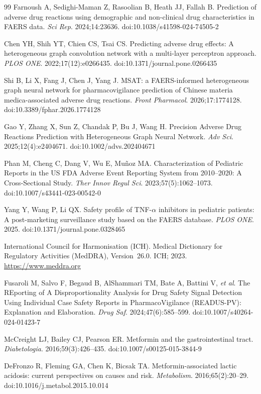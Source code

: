 \documentclass[10pt]{article}
\begin{document}
\begin{thebibliography}{99}
Farnoush A, Sedighi-Maman Z, Rasoolian B, Heath JJ, Fallah B.
Prediction of adverse drug reactions using demographic and non-clinical drug characteristics in FAERS data.
\textit{Sci Rep}. 2024;14:23636.
doi:10.1038/s41598-024-74505-2
 
Chen YH, Shih YT, Chien CS, Tsai CS.
Predicting adverse drug effects: A heterogeneous graph convolution network with a multi-layer perceptron approach.
\textit{PLOS ONE}. 2022;17(12):e0266435.
doi:10.1371/journal.pone.0266435
 
Shi B, Li X, Fang J, Chen J, Yang J.
MSAT: a FAERS-informed heterogeneous graph neural network for pharmacovigilance prediction of Chinese materia medica-associated adverse drug reactions.
\textit{Front Pharmacol}. 2026;17:1774128.
doi:10.3389/fphar.2026.1774128
 
Gao Y, Zhang X, Sun Z, Chandak P, Bu J, Wang H.
Precision Adverse Drug Reactions Prediction with Heterogeneous Graph Neural Network.
\textit{Adv Sci}. 2025;12(4):e2404671.
doi:10.1002/advs.202404671
 
Phan M, Cheng C, Dang V, Wu E, Mu\~{n}oz MA.
Characterization of Pediatric Reports in the US FDA Adverse Event Reporting System from 2010--2020: A Cross-Sectional Study.
\textit{Ther Innov Regul Sci}. 2023;57(5):1062--1073.
doi:10.1007/s43441-023-00542-0
 
Yang Y, Wang P, Li QX.
Safety profile of TNF-$\alpha$ inhibitors in pediatric patients: A post-marketing surveillance study based on the FAERS database.
\textit{PLOS ONE}. 2025.
doi:10.1371/journal.pone.0328465
 
International Council for Harmonisation (ICH).
Medical Dictionary for Regulatory Activities (MedDRA),
Version~26.0. ICH; 2023.
\url{https://www.meddra.org}
 
Fusaroli M, Salvo F, Begaud B, AlShammari TM, Bate A, Battini V, \textit{et al}.
The REporting of A Disproportionality Analysis for Drug Safety Signal Detection Using Individual Case Safety Reports in PharmacoVigilance (READUS-PV): Explanation and Elaboration.
\textit{Drug Saf}. 2024;47(6):585--599.
doi:10.1007/s40264-024-01423-7
 
McCreight LJ, Bailey CJ, Pearson ER.
Metformin and the gastrointestinal tract.
\textit{Diabetologia}. 2016;59(3):426--435.
doi:10.1007/s00125-015-3844-9
 
DeFronzo R, Fleming GA, Chen K, Bicsak TA.
Metformin-associated lactic acidosis: current perspectives
on causes and risk.
\textit{Metabolism}. 2016;65(2):20--29.
doi:10.1016/j.metabol.2015.10.014
 

\end{thebibliography}
\end{document}

